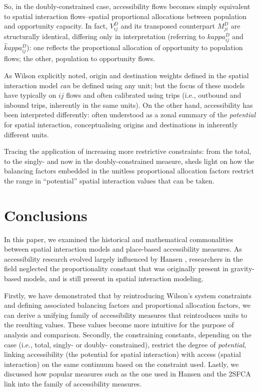 \documentclass[
  10pt,
  letterpaper,
]{article}
\begin{document}
So, in the doubly-constrained case, accessibility flows becomes simply
equivalent to spatial interaction flows--spatial proportional
allocations between population and opportunity capacity. In fact,
\(V^D_{ij}\) and its transposed counterpart \(M^D_{ji}\) are
structurally identical, differing only in interpretation (referring to
\(kappa_{ij}^D\) and \(\hat kappa_{ij}^D\)): one reflects the
proportional allocation of opportunity to population flows; the other,
population to opportunity flows.

As Wilson \citep{wilson1971} explicitly noted, origin and destination
weights defined in the spatial interaction model \emph{can} be defined
using any unit; but the focus of these models have typically on \(ij\)
flows and often calibrated using trips (i.e., outbound and inbound
trips, inherently in the same units). On the other hand, accessibility
has been interpreted differently: often understood as a zonal summary of
the \emph{potential} for spatial interaction, conceptualising origins
and destinations in inherently different units.

Tracing the application of increasing more restrictive constraints: from
the total, to the singly- and now in the doubly-constrained measure,
sheds light on how the balancing factors embedded in the unitless
proportional allocation factors restrict the range in ``potential''
spatial interaction values that can be taken.

\section{Conclusions}\label{conclusions}

In this paper, we examined the historical and mathematical commonalities
between spatial interaction models and place-based accessibility
measures. As accessibility research evolved largely influenced by Hansen
\citep{hansen1959}, researchers in the field neglected the
proportionality constant that was originally present in gravity-based
models, and is still present in spatial interaction modeling.

Firstly, we have demonstrated that by reintroducing Wilson's system
constraints and defining associated balancing factors and proportional
allocation factors, we can derive a unifying family of accessibility
measures that reintroduces units to the resulting values. These values
become more intuitive for the purpose of analysis and comparison.
Secondly, the constraining constants, depending on the case (i.e.,
total, singly- or doubly- constrained), restrict the degree of
\emph{potential}, linking accessibility (the potential for spatial
interaction) with access (spatial interaction) on the same continuum
based on the constraint used. Lastly, we discussed how popular measures
such as the one used in Hansen \citep{hansen1959} and the 2SFCA link
into the family of accessibility measures.
\end{document}
